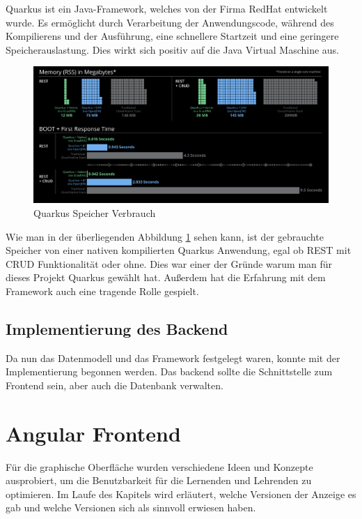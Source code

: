 Quarkus ist ein Java-Framework, welches von der Firma RedHat entwickelt wurde. Es ermöglicht durch Verarbeitung der Anwendungscode, während des Kompilierens und der Ausführung, eine schnellere Startzeit und eine geringere Speicherauslastung. Dies wirkt sich positiv auf die Java Virtual Maschine aus. \cite{Thomas}

\begin{figure}[H]
    \centering
    \includegraphics[width=1\textwidth]{pics/quarkus_Memory.png}
    \caption{Quarkus Speicher Verbrauch \cite{Quarkus} }
    \label{fig:quarkus_memory}
\end{figure}


Wie man in der überliegenden Abbildung \ref{fig:quarkus_memory} sehen kann, ist der gebrauchte Speicher von einer nativen kompilierten Quarkus Anwendung, egal ob REST mit CRUD Funktionalität oder ohne. Dies war einer der Gründe warum man für dieses Projekt Quarkus gewählt hat. Außerdem hat die Erfahrung mit dem Framework auch eine tragende Rolle gespielt.

\newpage

\subsection{Implementierung des Backend}

Da nun das Datenmodell und das Framework festgelegt waren, konnte mit der Implementierung begonnen werden. Das backend sollte die Schnittstelle zum Frontend sein, aber auch die Datenbank verwalten.


\section{Angular Frontend}
Für die graphische Oberfläche wurden verschiedene Ideen und Konzepte ausprobiert, um die Benutzbarkeit für die Lernenden und Lehrenden zu optimieren.
Im Laufe des Kapitels wird erläutert, welche Versionen der Anzeige es gab und welche Versionen sich als sinnvoll erwiesen haben.

